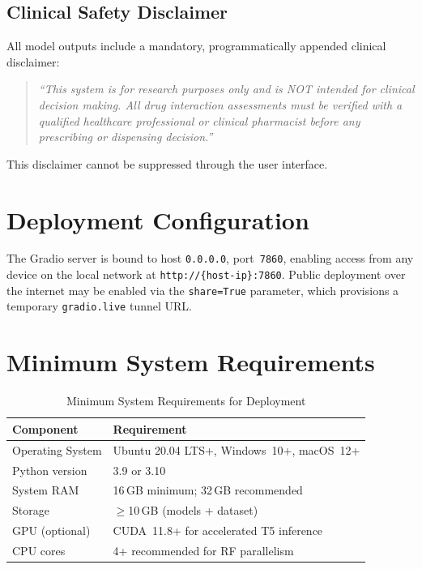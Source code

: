 \documentclass[12pt,a4paper,oneside]{report}
\begin{document}
\subsection{Clinical Safety Disclaimer}

All model outputs include a mandatory, programmatically appended clinical disclaimer:

\begin{quote}
\textit{``This system is for research purposes only and is NOT intended for clinical decision
making. All drug interaction assessments must be verified with a qualified healthcare
professional or clinical pharmacist before any prescribing or dispensing decision.''}
\end{quote}

\noindent This disclaimer cannot be suppressed through the user interface.

\section{Deployment Configuration}

The Gradio server is bound to host \texttt{0.0.0.0}, port~\texttt{7860}, enabling access
from any device on the local network at \texttt{http://\{host-ip\}:7860}. Public
deployment over the internet may be enabled via the \texttt{share=True} parameter, which
provisions a temporary \texttt{gradio.live} tunnel URL.

\section{Minimum System Requirements}

\begin{table}[htbp]
\centering
\caption{Minimum System Requirements for Deployment}
\label{tab:sysreq}
\begin{tabular}{ll}
\toprule
\textbf{Component} & \textbf{Requirement} \\
\midrule
Operating System & Ubuntu 20.04 LTS+, Windows~10+, macOS~12+ \\
Python version   & 3.9 or 3.10 \\
System RAM       & 16\,GB minimum; 32\,GB recommended \\
Storage          & $\geq$10\,GB (models + dataset) \\
GPU (optional)   & CUDA~11.8+ for accelerated T5 inference \\
CPU cores        & 4+ recommended for RF parallelism \\
\bottomrule
\end{tabular}
\end{table}
\end{document}
